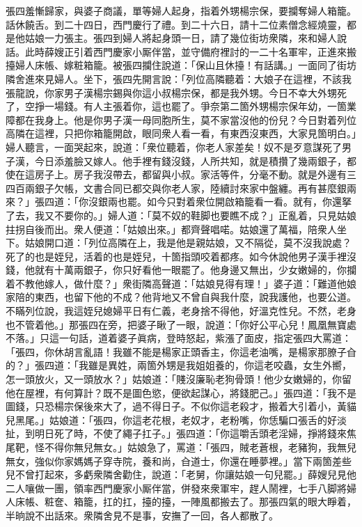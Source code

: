 張四羞慚歸家，與婆子商議，{}單等婦人起身，指着外甥楊宗保，要攔奪婦人箱籠。話休饒舌。到二十四日，西門慶行了禮。到二十六日，請十二位素僧念經燒靈，都是他姑娘一力張主。張四到婦人將起身頭一日，請了幾位街坊衆隣，來和婦人說話。此時薛嫂正引着西門慶家小厮伴當，並守備府裡討的一二十名軍牢，正進來搬擡婦人床帳、嫁粧箱籠。被張四攔住說道：「保山且休擡！有話講。」一面同了街坊隣舍進來見婦人。坐下，張四先開言說：「列位高隣聽着：大娘子在這裡，不該我張龍說，{}你家男子漢楊宗錫與你這小叔楊宗保，都是我外甥。今日不幸大外甥死了，空掙一場錢。有人主張着你，{}這也罷了。爭奈第二箇外甥楊宗保年幼，一箇業障都在我身上。他是你男子漢一母同胞所生，莫不家當沒他的份兒？今日對着列位高隣在這裡，只把你箱籠開啟，眼同衆人看一看，有東西沒東西，大家見箇明白。」婦人聽言，一面哭起來，說道：「衆位聽着，你老人家差矣！奴不是歹意謀死了男子漢，今日添羞臉又嫁人。他手裡有錢沒錢，人所共知，就是積攢了幾兩銀子，都使在這房子上。{}房子我沒帶去，都留與小叔。家活等件，分毫不動。就是外邊有三四百兩銀子欠帳，文書合同已都交與你老人家，陸續討來家中盤纏。再有甚麼銀兩來？」張四道：「你沒銀兩也罷。如今只對着衆位開啟箱籠看一看。就有，你還拏了去，我又不要你的。」婦人道：「莫不奴的鞋脚也要瞧不成？」正亂着，只見姑娘拄拐自後而出。{}衆人便道：「姑娘出來。」都齊聲唱喏。姑娘還了萬福，陪衆人坐下。姑娘開口道：「列位高隣在上，我是他是親姑娘，又不隔從，莫不沒我說處？死了的也是姪兒，活着的也是姪兒，十箇指頭咬着都疼。如今休說他男子漢手裡沒錢，他就有十萬兩銀子，你只好看他一眼罷了。他身邊又無出，少女嫩婦的，你攔着不教他嫁人，做什麼？」衆街隣高聲道：「姑娘見得有理！」婆子道：「難道他娘家陪的東西，也留下他的不成？他背地又不曾自與我什麼，{}說我護他，也要公道。不瞞列位說，我這姪兒媳婦平日有仁義，老身捨不得他，好溫克性兒。不然，老身也不管着他。」那張四在旁，把婆子瞅了一眼，{}說道：「你好公平心兒！鳳凰無寶處不落。」只這一句話，道着婆子眞病，登時怒起，紫漲了面皮，指定張四大罵道：「張四，你休胡言亂語！我雖不能是楊家正頭香主，你這老油嘴，是楊家那膫子㒲的？」{}張四道：「我雖是異姓，兩箇外甥是我姐姐養的，你這老咬蟲，女生外嚮，怎一頭放火，又一頭放水？」姑娘道：「賤沒廉恥老狗骨頭！他少女嫩婦的，你留他在屋裡，有何算計？既不是圖色慾，便欲起謀心，將錢肥己。」張四道：「我不是圖錢，只恐楊宗保後來大了，過不得日子。不似你這老殺才，搬着大引着小，黃貓兒黑尾。」姑娘道：「張四，你這老花根，老奴才，老粉嘴，你恁騙口張舌的好淡扯，到明日死了時，不使了繩子扛子。」張四道：「你這嚼舌頭老淫婦，掙將錢來焦尾靶，怪不得你無兒無女。」姑娘急了，罵道：「張四，賊老蒼根，老豬狗，我無兒無女，強似你家媽媽子穿寺院，養和尚，㒲道士，你還在睡夢裡。」當下兩箇差些兒不曾打起來，多虧衆隣舍勸住，說道：「老舅，你讓姑娘一句兒罷。」薛嫂兒見他二人嚷做一團，領率西門慶家小厮伴當，併發來衆軍牢，趕人鬧裡，七手八脚將婦人床帳、粧奩、箱籠，扛的扛，擡的擡，一陣風都搬去了。{}那張四氣的眼大睜着，半晌說不出話來。衆隣舍見不是事，安撫了一回，各人都散了。

